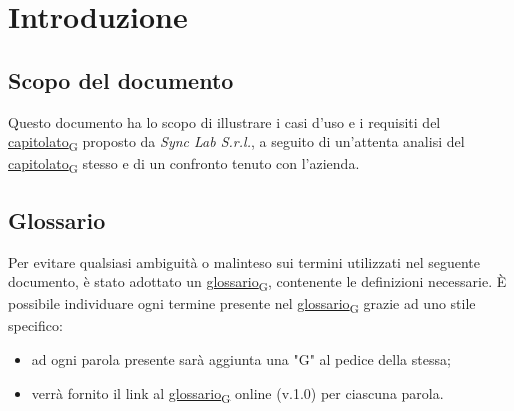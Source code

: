 \section{Introduzione}
\setcounter{subsection}{0}
\subsection{Scopo del documento}
Questo documento ha lo scopo di illustrare i casi d'uso e i requisiti del \href{https://7last.github.io/docs/rtb/documentazione-interna/glossario\#capitolato}{capitolato\textsubscript{G}} proposto da \textit{Sync Lab S.r.l.}, a seguito di un'attenta analisi del \href{https://7last.github.io/docs/rtb/documentazione-interna/glossario\#capitolato}{capitolato\textsubscript{G}} stesso e di un confronto tenuto con l'azienda.
\subsection{Glossario}
Per evitare qualsiasi ambiguità o malinteso sui termini utilizzati nel seguente documento, è stato adottato un \href{https://7last.github.io/docs/rtb/documentazione-interna/glossario\#glossario}{glossario\textsubscript{G}}, contenente le definizioni necessarie. È possibile individuare ogni termine presente nel \href{https://7last.github.io/docs/rtb/documentazione-interna/glossario\#glossario}{glossario\textsubscript{G}} grazie ad uno stile specifico:
\begin{itemize}
	\item ad ogni parola presente sarà aggiunta una "G" al pedice della stessa;
	\item verrà fornito il link al \href{https://7last.github.io/docs/rtb/documentazione-interna/glossario\#glossario}{glossario\textsubscript{G}} online (v.1.0) per ciascuna parola. %
\end{itemize}

